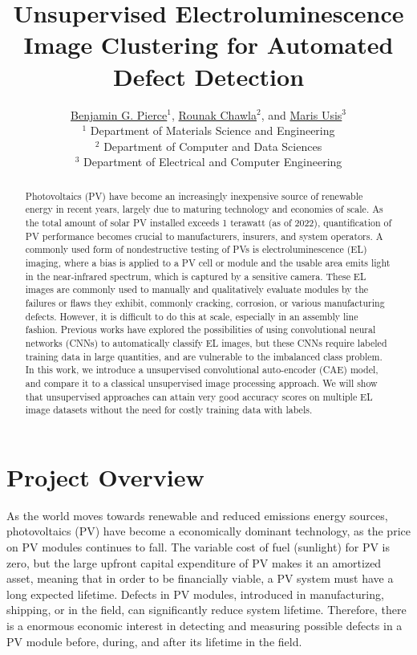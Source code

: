 \documentclass[12pt]{article}
\date{}
\begin{document}
\title{Unsupervised Electroluminescence Image Clustering for Automated Defect Detection}
	
 \author{\href{mailto:bgp12@case.edu}{Benjamin G. Pierce}$^1$,
        \href{mailto:rxc542@case.edu}{Rounak Chawla}$^2$, and 
        \href{mailto:mau13@case.edu}{Maris Usis}$^3$\\
        $^1$ Department of Materials Science and Engineering\\
        $^2$ Department of Computer and Data Sciences\\
        $^3$ Department of Electrical and Computer Engineering}
\maketitle
\begin{abstract}

Photovoltaics (PV) have become an increasingly inexpensive source of renewable energy in recent years, largely due to maturing technology and economies of scale. 
As the total amount of solar PV installed exceeds 1 terawatt (as of 2022), quantification of PV performance becomes crucial to manufacturers, insurers, and system operators. 
A commonly used form of nondestructive testing of PVs is electroluminescence (EL) imaging, where a bias is applied to a PV cell or module and the usable area emits light in the near-infrared spectrum, which is captured by a sensitive camera. 
These EL images are commonly used to manually and qualitatively evaluate modules by the failures or flaws they exhibit, commonly cracking, corrosion, or various manufacturing defects. 
However, it is difficult to do this at scale, especially in an assembly line fashion. 
Previous works have explored the possibilities of using convolutional neural networks (CNNs) to automatically classify EL images, but these CNNs require labeled training data in large quantities, and are vulnerable to the imbalanced class problem. 
In this work, we introduce a unsupervised convolutional auto-encoder (CAE) model, and compare it to a classical unsupervised image processing approach. 
We will show that unsupervised approaches can attain very good accuracy scores on multiple EL image datasets without the need for costly training data with labels.
\end{abstract}

\section{Project Overview}
As the world moves towards renewable and reduced emissions energy sources, photovoltaics (PV) have become a economically dominant technology, as the price on PV modules continues to fall. 
The variable cost of fuel (sunlight) for PV is zero, but the large upfront capital expenditure of PV makes it an amortized asset, meaning that in order to be financially viable, a PV system must have a long expected lifetime. 
Defects in PV modules, introduced in manufacturing, shipping, or in the field, can significantly reduce system lifetime. 
Therefore, there is a enormous economic interest in detecting and measuring possible defects in a PV module before, during, and after its lifetime in the field. 
\end{document}
